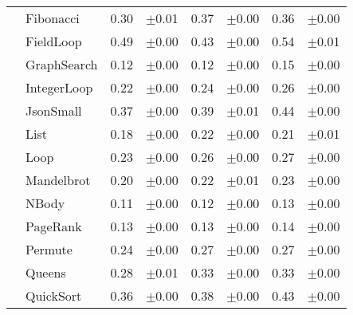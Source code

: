 \begin{tabular}{ll@{\hspace{6pt}}r@{\hspace{3pt}}l@{\hspace{6pt}}r@{\hspace{3pt}}l@{\hspace{6pt}}r@{\hspace{3pt}}l}
 & Fibonacci & 0.30 & \scriptsize\textcolor{gray!60}{$\pm$0.01} & 0.37 & \scriptsize\textcolor{gray!60}{$\pm$0.00} & 0.36 & \scriptsize\textcolor{gray!60}{$\pm$0.00} \\
 & FieldLoop & 0.49 & \scriptsize\textcolor{gray!60}{$\pm$0.00} & 0.43 & \scriptsize\textcolor{gray!60}{$\pm$0.00} & 0.54 & \scriptsize\textcolor{gray!60}{$\pm$0.01} \\
 & GraphSearch & 0.12 & \scriptsize\textcolor{gray!60}{$\pm$0.00} & 0.12 & \scriptsize\textcolor{gray!60}{$\pm$0.00} & 0.15 & \scriptsize\textcolor{gray!60}{$\pm$0.00} \\
 & IntegerLoop & 0.22 & \scriptsize\textcolor{gray!60}{$\pm$0.00} & 0.24 & \scriptsize\textcolor{gray!60}{$\pm$0.00} & 0.26 & \scriptsize\textcolor{gray!60}{$\pm$0.00} \\
 & JsonSmall & 0.37 & \scriptsize\textcolor{gray!60}{$\pm$0.00} & 0.39 & \scriptsize\textcolor{gray!60}{$\pm$0.01} & 0.44 & \scriptsize\textcolor{gray!60}{$\pm$0.00} \\
 & List & 0.18 & \scriptsize\textcolor{gray!60}{$\pm$0.00} & 0.22 & \scriptsize\textcolor{gray!60}{$\pm$0.00} & 0.21 & \scriptsize\textcolor{gray!60}{$\pm$0.01} \\
 & Loop & 0.23 & \scriptsize\textcolor{gray!60}{$\pm$0.00} & 0.26 & \scriptsize\textcolor{gray!60}{$\pm$0.00} & 0.27 & \scriptsize\textcolor{gray!60}{$\pm$0.00} \\
 & Mandelbrot & 0.20 & \scriptsize\textcolor{gray!60}{$\pm$0.00} & 0.22 & \scriptsize\textcolor{gray!60}{$\pm$0.01} & 0.23 & \scriptsize\textcolor{gray!60}{$\pm$0.00} \\
 & NBody & 0.11 & \scriptsize\textcolor{gray!60}{$\pm$0.00} & 0.12 & \scriptsize\textcolor{gray!60}{$\pm$0.00} & 0.13 & \scriptsize\textcolor{gray!60}{$\pm$0.00} \\
 & PageRank & 0.13 & \scriptsize\textcolor{gray!60}{$\pm$0.00} & 0.13 & \scriptsize\textcolor{gray!60}{$\pm$0.00} & 0.14 & \scriptsize\textcolor{gray!60}{$\pm$0.00} \\
 & Permute & 0.24 & \scriptsize\textcolor{gray!60}{$\pm$0.00} & 0.27 & \scriptsize\textcolor{gray!60}{$\pm$0.00} & 0.27 & \scriptsize\textcolor{gray!60}{$\pm$0.00} \\
 & Queens & 0.28 & \scriptsize\textcolor{gray!60}{$\pm$0.01} & 0.33 & \scriptsize\textcolor{gray!60}{$\pm$0.00} & 0.33 & \scriptsize\textcolor{gray!60}{$\pm$0.00} \\
 & QuickSort & 0.36 & \scriptsize\textcolor{gray!60}{$\pm$0.00} & 0.38 & \scriptsize\textcolor{gray!60}{$\pm$0.00} & 0.43 & \scriptsize\textcolor{gray!60}{$\pm$0.00} \\

\end{tabular}
